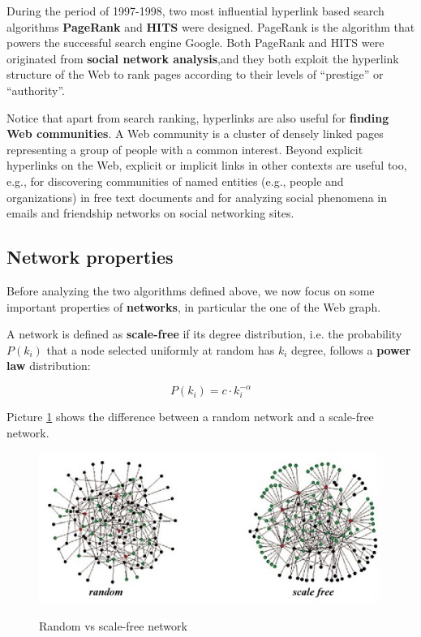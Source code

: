 During the period of 1997-1998, two most influential hyperlink based search algorithms \textbf{PageRank} and \textbf{HITS} were designed. PageRank is the algorithm that powers the successful search engine Google. Both PageRank and HITS were originated from \textbf{social network analysis},and they both exploit the hyperlink structure of the Web to rank pages according to their levels of “prestige” or “authority”. 

Notice that apart from search ranking, hyperlinks are also useful for \textbf{finding Web communities}. A Web community is a cluster of densely linked pages representing a group of people with a common interest. Beyond explicit hyperlinks on the Web, explicit or implicit links in other contexts are useful too, e.g., for discovering communities of named entities (e.g., people and organizations) in free text documents and for analyzing social phenomena in emails and friendship networks on social networking sites.

\subsection{Network properties}
Before analyzing the two algorithms defined above, we now focus on some important properties of \textbf{networks}, in particular the one of the Web graph. 

A network is defined as \textbf{scale-free} if its degree distribution, i.e. the probability $P(k_i)$ that a node selected uniformly at random has $k_i$ degree, follows a \textbf{power law} distribution:

$$
P(k_i) = c \cdot k_i ^{-\alpha}
$$

Picture \ref{random vs scale free} shows the difference between a random network and a scale-free network.

\begin{figure}[h!]
		\centering
		\includegraphics[scale = 1.8]{img/random vs scale free.jpg}
		\label{random vs scale free}
        \caption{Random vs scale-free network}
\end{figure}

